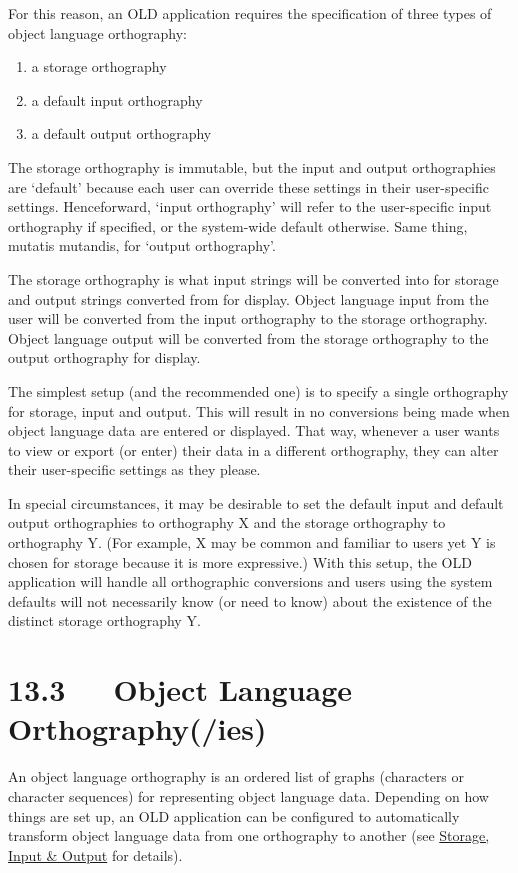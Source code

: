\documentclass[letterpaper,10pt,english]{sphinxmanual}
\begin{document}
For this reason, an OLD application requires the specification of three types
of object language orthography:
\begin{enumerate}
\item {} 
a storage orthography

\item {} 
a default input orthography

\item {} 
a default output orthography

\end{enumerate}

The storage orthography is immutable, but the input and output orthographies are
`default' because each user can override these settings in their user-specific
settings.  Henceforward, `input orthography' will refer to the user-specific
input orthography if specified, or the system-wide default otherwise.  Same
thing, mutatis mutandis, for `output orthography'.

The storage orthography is what input strings will be converted into for storage
and output strings converted from for display.  Object language input from the
user will be converted from the input orthography to the storage orthography.
Object language output will be converted from the storage orthography to the
output orthography for display.

The simplest setup (and the recommended one) is to specify a single orthography
for storage, input and output.  This will result in no conversions being made
when object language data are entered or displayed.  That way, whenever a user
wants to view or export (or enter) their data in a different orthography, they
can alter their user-specific settings as they please.

In special circumstances, it may be desirable to set the default input and
default output orthographies to orthography X and the storage orthography to
orthography Y.  (For example, X may be common and familiar to users yet Y is
chosen for storage because it is more expressive.)  With this setup, the OLD
application will handle all orthographic conversions and users using the
system defaults will not necessarily know (or need to know) about the existence
of the distinct storage orthography Y.


\section{13.3   Object Language Orthography(/ies)}
\label{documentation:object-language-orthography-ies}
An object language orthography is an ordered list of graphs (characters or
character sequences) for representing object language data.  Depending on how
things are set up, an OLD application can be configured to automatically
transform object language data from one orthography to another (see
{\hyperref[documentation:storage-input-output]{Storage, Input \& Output}} for details).
\end{document}
